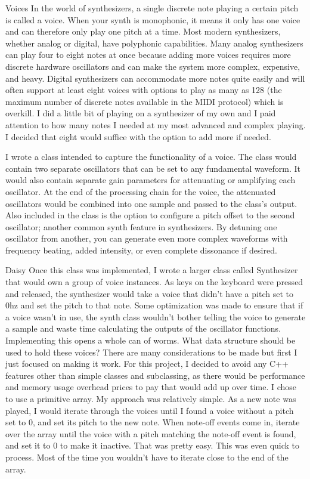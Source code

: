 \documentclass[acmlarge,screen]{acmart}
\begin{document}
Voices
In the world of synthesizers, a single discrete note playing a certain pitch is called a voice. When your synth is monophonic, it means it only has one voice and can therefore only play one pitch at a time. Most modern synthesizers, whether analog or digital, have polyphonic capabilities. Many analog synthesizers can play four to eight notes at once because adding more voices requires more discrete hardware oscillators and can make the system more complex, expensive, and heavy. Digital synthesizers can accommodate more notes quite easily and will often support at least eight voices with options to play as many as 128 (the maximum number of discrete notes available in the MIDI protocol) which is overkill. I did a little bit of playing on a synthesizer of my own and I paid attention to how many notes I needed at my most advanced and complex playing. I decided that eight would suffice with the option to add more if needed.

I wrote a class intended to capture the functionality of a voice. The class would contain two separate oscillators that can be set to any fundamental waveform. It would also contain separate gain parameters for attenuating or amplifying each oscillator. At the end of the processing chain for the voice, the attenuated oscillators would be combined into one sample and passed to the class's output. Also included in the class is the option to configure a pitch offset to the second oscillator; another common synth feature in synthesizers. By detuning one oscillator from another, you can generate even more complex waveforms with frequency beating, added intensity, or even complete dissonance if desired.

Daisy
Once this class was implemented, I wrote a larger class called Synthesizer that would own a group of voice instances. As keys on the keyboard were pressed and released, the synthesizer would take a voice that didn't have a pitch set to 0hz and set the pitch to that note. Some optimization was made to ensure that if a voice wasn't in use, the synth class wouldn't bother telling the voice to generate a sample and waste time calculating the outputs of the oscillator functions. Implementing this opens a whole can of worms. What data structure should be used to hold these voices? There are many considerations to be made but first I just focused on making it work. For this project, I decided to avoid any C++ features other than simple classes and subclassing, as there would be performance and memory usage overhead prices to pay that would add up over time. I chose to use a primitive array. My approach was relatively simple. As a new note was played, I would iterate through the voices until I found a voice without a pitch set to 0, and set its pitch to the new note. When note-off events come in, iterate over the array until the voice with a pitch matching the note-off event is found, and set it to 0 to make it inactive. That was pretty easy. This was even quick to process. Most of the time you wouldn't have to iterate close to the end of the array.
\end{document}
